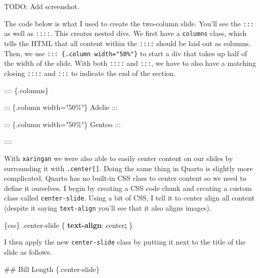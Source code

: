 \documentclass[
]{book}
\newenvironment{Shaded}{\begin{snugshade}}{\end{snugshade}}
\newcommand{\DecValTok}[1]{\textcolor[rgb]{0.00,0.00,0.81}{#1}}
\newcommand{\FunctionTok}[1]{\textcolor[rgb]{0.00,0.00,0.00}{#1}}
\newcommand{\KeywordTok}[1]{\textcolor[rgb]{0.13,0.29,0.53}{\textbf{#1}}}
\newcommand{\NormalTok}[1]{#1}
\newcommand{\OperatorTok}[1]{\textcolor[rgb]{0.81,0.36,0.00}{\textbf{#1}}}
\begin{document}
TODO: Add screenshot.

The code below is what I used to create the two-column slide. You'll see the \texttt{:::} as well as \texttt{::::}. This creates nested divs. We first have a \texttt{columns} class, which tells the HTML that all content within the \texttt{::::} should be laid out as columns. Then, we use \texttt{:::\ \{.column\ width="50\%"\}} to start a div that takes up half of the width of the slide. With both \texttt{::::} and \texttt{:::}, we have to also have a matching closing \texttt{::::} and \texttt{:::} to indicate the end of the section.

\begin{Shaded}
\begin{Highlighting}[]
\NormalTok{:::: \{.columns\}}

\NormalTok{::: \{.column width="50\%"\}}
\NormalTok{Adelie}
\NormalTok{:::}

\NormalTok{::: \{.column width="50\%"\}}
\NormalTok{Gentoo}
\NormalTok{:::}

\NormalTok{::::}
\end{Highlighting}
\end{Shaded}

With \texttt{xaringan} we were also able to easily center content on our slides by surrounding it with \texttt{.center{[}{]}}. Doing the same thing in Quarto is slightly more complicated. Quarto has no built-in CSS class to center content so we need to define it ourselves. I begin by creating a CSS code chunk and creating a custom class called \texttt{center-slide}. Using a bit of CSS, I tell it to center align all content (despite it saying \texttt{text-align} you'll see that it also aligns images).

\begin{Shaded}
\begin{Highlighting}[]
\NormalTok{\textasciigrave{}\textasciigrave{}\textasciigrave{}\{css\}}
\FunctionTok{.center{-}slide}\NormalTok{ \{}
    \KeywordTok{text{-}align}\NormalTok{: }\DecValTok{center}\OperatorTok{;}
\NormalTok{\}}
\NormalTok{\textasciigrave{}\textasciigrave{}\textasciigrave{}}
\end{Highlighting}
\end{Shaded}

I then apply the new \texttt{center-slide} class by putting it next to the title of the slide as follows.

\begin{Shaded}
\begin{Highlighting}[]
\NormalTok{\#\# Bill Length \{}\FunctionTok{.center{-}slide}\NormalTok{\}}
\end{Highlighting}
\end{Shaded}
\end{document}
